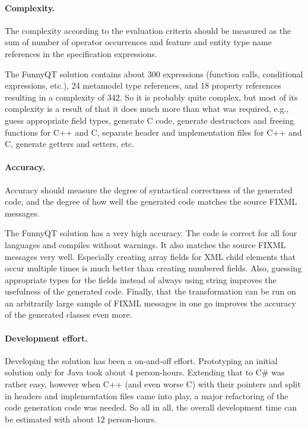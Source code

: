 \documentclass[submission]{eptcs}
\begin{document}
\paragraph{Complexity.}
\label{sec:complexity}

The complexity according to the evaluation criteria should be measured as the
sum of number of operator occurrences and feature and entity type name
references in the specification expressions.

The FunnyQT solution contains about 300 expressions (function calls,
conditional expressions, etc.), 24 metamodel type references, and 18 property
references resulting in a complexity of 342.  So it is probably quite complex,
but most of its complexity is a result of that it does much more than what was
required, e.g., guess appropriate field types, generate C code, generate
destructors and freeing functions for C++ and C, separate header and
implementation files for C++ and C, generate getters and setters, etc.


\paragraph{Accuracy.}
\label{sec:accuracy}

Accuracy should measure the degree of syntactical correctness of the generated
code, and the degree of how well the generated code matches the source FIXML
messages.

The FunnyQT solution has a very high accuracy.  The code is correct for all
four languages and compiles without warnings.  It also matches the source FIXML
messages very well.  Especially creating array fields for XML child elements
that occur multiple times is much better than creating numbered fields.  Also,
guessing appropriate types for the fields instead of always using string
improves the usefulness of the generated code.  Finally, that the
transformation can be run on an arbitrarily large sample of FIXML messages in
one go improves the accuracy of the generated classes even more.

\paragraph{Development effort.}
\label{sec:development-effort}

Developing the solution has been a on-and-off effort.  Prototyping an initial
solution only for Java took about 4 person-hours.  Extending that to C\# was
rather easy, however when C++ (and even worse C) with their pointers and split
in headers and implementation files came into play, a major refactoring of the
code generation code was needed.  So all in all, the overall development time
can be estimated with about 12 person-hours.
\end{document}
